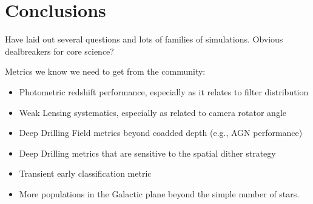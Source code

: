 \section{Conclusions}

Have laid out several questions and lots of families of simulations. Obvious dealbreakers for core science? 

Metrics we know we need to get from the community:
\begin{itemize}
    \item{Photometric redshift performance, especially as it relates to filter distribution}
    \item{Weak Lensing systematics, especially as related to camera rotator angle}
    \item{Deep Drilling Field metrics beyond coadded depth (e.g., AGN performance)}
    \item{Deep Drilling metrics that are sensitive to the spatial dither strategy}
    \item{Transient early classification metric}
    \item{More populations in the Galactic plane beyond the simple number of stars.}
\end{itemize}

